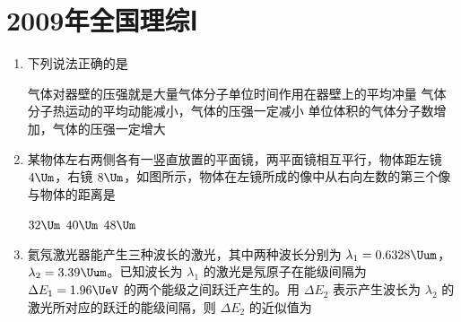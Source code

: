 \documentclass[\gkver]{gaokaozhenti}
\begin{document}
\chapter{2009年全国理综Ⅰ}

\begin{enumerate}
\item
下列说法正确的是

{气体对器壁的压强就是大量气体分子单位时间作用在器壁上的平均冲量}
{气体分子热运动的平均动能减小，气体的压强一定减小}
{单位体积的气体分子数增加，气体的压强一定增大}


\item
某物体左右两侧各有一竖直放置的平面镜，两平面镜相互平行，物体距左镜 $4\Um$，右镜 $8\Um$，如图所示，物体在左镜所成的像中从右向左数的第三个像与物体的距离是


\fourchoices[answer=B]
{$24\Um$}
{$32\Um$}
{$40\Um$}
{$48\Um$}


\item
氦氖激光器能产生三种波长的激光，其中两种波长分别为 $\lambda_{1}=0.6328\Uum$，$\lambda_{2}=3.39\Uum$。已知波长为 $\lambda_{1}$ 的激光是氖原子在能级间隔为 $\Delta E_{1}=1.96\UeV$ 的两个能级之间跃迁产生的。用 $\Delta E_{2}$ 表示产生波长为 $\lambda_{2}$ 的激光所对应的跃迁的能级间隔，则 $\Delta E_{2}$ 的近似值为


\end{enumerate}
\end{document}
